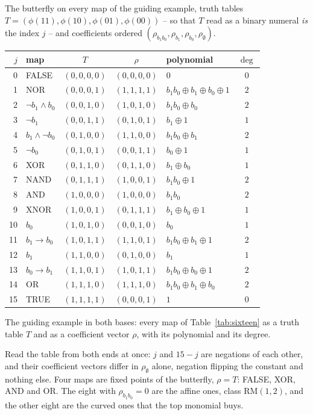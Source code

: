 \documentclass[11pt]{article}
\begin{document}
\begin{example}
The butterfly on every map of the guiding example, truth tables
$T = (\phi(11), \phi(10), \phi(01), \phi(00))$ -- so that $T$ read as
a binary numeral \emph{is} the index $j$ -- and coefficients ordered
$(\rho_{b_1 b_0}, \rho_{b_1}, \rho_{b_0}, \rho_\emptyset)$.

\begin{center}
\begin{tabular}{r l c c l c}
\toprule
$j$ & map & $T$ & $\rho$ & polynomial & $\deg$ \\
\midrule
0 & FALSE & $(0,0,0,0)$ & $(0,0,0,0)$ & $0$ & $0$ \\
1 & NOR & $(0,0,0,1)$ & $(1,1,1,1)$ &
  $b_1b_0 \oplus b_1 \oplus b_0 \oplus 1$ & $2$ \\
2 & $\lnot b_1 \wedge b_0$ & $(0,0,1,0)$ & $(1,0,1,0)$ & $b_1b_0 \oplus b_0$ & $2$ \\
3 & $\lnot b_1$ & $(0,0,1,1)$ & $(0,1,0,1)$ & $b_1 \oplus 1$ & $1$ \\
4 & $b_1 \wedge \lnot b_0$ & $(0,1,0,0)$ & $(1,1,0,0)$ & $b_1b_0 \oplus b_1$ & $2$ \\
5 & $\lnot b_0$ & $(0,1,0,1)$ & $(0,0,1,1)$ & $b_0 \oplus 1$ & $1$ \\
6 & XOR & $(0,1,1,0)$ & $(0,1,1,0)$ & $b_1 \oplus b_0$ & $1$ \\
7 & NAND & $(0,1,1,1)$ & $(1,0,0,1)$ & $b_1b_0 \oplus 1$ & $2$ \\
8 & AND & $(1,0,0,0)$ & $(1,0,0,0)$ & $b_1b_0$ & $2$ \\
9 & XNOR & $(1,0,0,1)$ & $(0,1,1,1)$ & $b_1 \oplus b_0 \oplus 1$ & $1$ \\
10 & $b_0$ & $(1,0,1,0)$ & $(0,0,1,0)$ & $b_0$ & $1$ \\
11 & $b_1 \to b_0$ & $(1,0,1,1)$ & $(1,1,0,1)$ & $b_1b_0 \oplus b_1 \oplus 1$ & $2$ \\
12 & $b_1$ & $(1,1,0,0)$ & $(0,1,0,0)$ & $b_1$ & $1$ \\
13 & $b_0 \to b_1$ & $(1,1,0,1)$ & $(1,0,1,1)$ & $b_1b_0 \oplus b_0 \oplus 1$ & $2$ \\
14 & OR & $(1,1,1,0)$ & $(1,1,1,0)$ & $b_1b_0 \oplus b_1 \oplus b_0$ & $2$ \\
15 & TRUE & $(1,1,1,1)$ & $(0,0,0,1)$ & $1$ & $0$ \\
\bottomrule
\end{tabular}
\end{center}
The guiding example in both bases: every map of
Table~\ref{tab:sixteen} as a truth table $T$ and as a coefficient
vector $\rho$, with its polynomial and its degree.

Read the table from both ends at once: $j$ and $15 - j$ are negations
of each other, and their coefficient vectors differ in $\rho_\emptyset$
alone, negation flipping the constant and nothing else. Four maps are
fixed points of the butterfly, $\rho = T$: FALSE, XOR, AND and OR.
The eight with $\rho_{b_1b_0} = 0$ are the affine ones, class
$\mathrm{RM}(1,2)$, and the other eight are the curved ones that the
top monomial buys.
\end{example}
\end{document}
